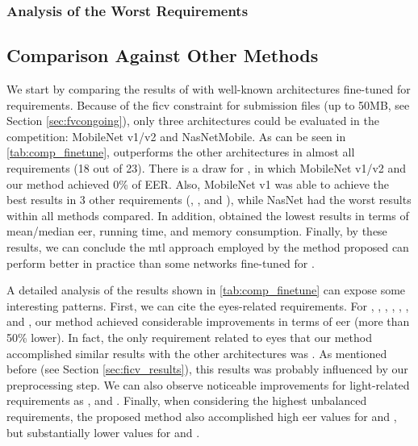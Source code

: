 

\subsubsection{Analysis of the Worst Requirements}


\subsection{Comparison Against Other Methods}

We start by comparing the results of \methodname with well-known architectures fine-tuned for \icao requirements. Because of the \acs{ficv} constraint for submission files (up to 50MB, see Section \ref{sec:fvcongoing}), only three architectures could be evaluated in the competition: MobileNet v1/v2 and NasNetMobile. As can be seen in \autoref{tab:comp_finetune}, \methodname outperforms the other architectures in almost all requirements (18 out of 23). There is a draw for \veiloverface, in which MobileNet v1/v2 and our method achieved 0\% of EER. Also, MobileNet v1 was able to achieve the best results in 3 other requirements (\pixelation, \hatcap, and \otherfacesortoys), while NasNet had the worst results within all methods compared. In addition, \methodname obtained the lowest results in terms of mean/median \acs{eer}, running time, and memory consumption. Finally, by these results, we can conclude the \acl{mtl} approach employed by the method proposed can perform better in practice than some networks fine-tuned for \icao.

A detailed analysis of the results shown in \autoref{tab:comp_finetune} can expose some interesting patterns. First, we can cite the eyes-related requirements. For \lookingaway, \eyesclosed, \redeyes, \darktintedlenses, \flashlenses, \framestooheavy, and \framecoveringeyes, our method achieved considerable improvements in terms of \acs{eer} (more than 50\% lower). In fact, the only requirement related to eyes that our method accomplished similar results with the other architectures was \hairacrosseyes. As mentioned before (see Section \ref{sec:ficv_results}), this results was probably influenced by our preprocessing step. We can also observe noticeable improvements for light-related requirements as \toodarklight, \shadowsbehindhead and \shadowsacrossface. Finally, when considering the highest unbalanced requirements, the proposed method also accomplished high \acs{eer} values for \inkmarked and \otherfacesortoys, but substantially lower values for \washedout and \framestooheavy.

